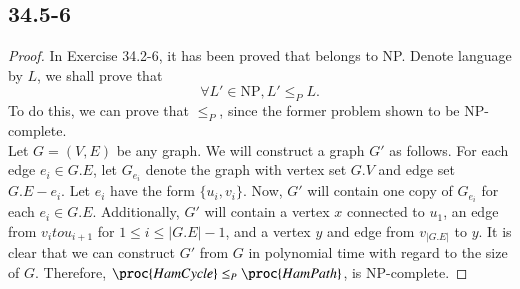 \documentclass[twocolumn, 10.5pt]{article}
\begin{document}
	\subsection*{34.5-6}
	\begin{proof}
		In Exercise 34.2-6, it has been proved that  belongs to NP. Denote language  by $L$, we shall prove that
		$$\forall L'\in\text{NP},L'\le_P L.$$  
		To do this, we can prove that $\le_P$, since the former problem shown to be NP-complete.\\
		Let $G = (V, E)$ be any graph. We will construct a graph
		$G'$ as follows. For each edge $e_i \in G.E$, let $G_{e_i}$ denote the graph with vertex set
		$G.V$ and edge set $G.E − {e_i}$. Let $e_i$ have the form $\{u_i, v_i\}$. Now, $G'$ will contain one copy of $G_{e_i}$
		for each $e_i\in G.E$. Additionally, $G'$ will contain a vertex $x$ connected
		to $u_1$, an edge from $v_i to u_{i+1}$ for $1 \le i \le |G.E| − 1$, and a vertex $y$ and edge from
		$v_|G.E|$ to $y$. It is clear that we can construct $G'$
		from $G$ in polynomial time with regard to the
		size of $G$. Therefore, $\proc{Ham Cycle}\le_P \proc{Ham Path}$,  is NP-complete.
	\end{proof}
\end{document}
